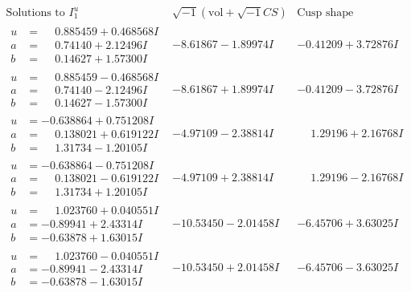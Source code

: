 \documentclass[1p]{elsarticle_modified}
\theoremstyle{definition}
\newcommand{\I}{\sqrt{-1}}
\begin{document}
$$\begin{array}{c|c|c}  
\text{Solutions to }I^u_{1}& \I (\text{vol} + \sqrt{-1}CS) & \text{Cusp shape}\\
 \hline 
\begin{aligned}
u &= \phantom{-}0.885459 + 0.468568 I \\
a &= \phantom{-}0.74140 + 2.12496 I \\
b &= \phantom{-}0.14627 + 1.57300 I\end{aligned}
 & -8.61867 - 1.89974 I & -0.41209 + 3.72876 I \\ \hline\begin{aligned}
u &= \phantom{-}0.885459 - 0.468568 I \\
a &= \phantom{-}0.74140 - 2.12496 I \\
b &= \phantom{-}0.14627 - 1.57300 I\end{aligned}
 & -8.61867 + 1.89974 I & -0.41209 - 3.72876 I \\ \hline\begin{aligned}
u &= -0.638864 + 0.751208 I \\
a &= \phantom{-}0.138021 + 0.619122 I \\
b &= \phantom{-}1.31734 - 1.20105 I\end{aligned}
 & -4.97109 - 2.38814 I & \phantom{-}1.29196 + 2.16768 I \\ \hline\begin{aligned}
u &= -0.638864 - 0.751208 I \\
a &= \phantom{-}0.138021 - 0.619122 I \\
b &= \phantom{-}1.31734 + 1.20105 I\end{aligned}
 & -4.97109 + 2.38814 I & \phantom{-}1.29196 - 2.16768 I \\ \hline\begin{aligned}
u &= \phantom{-}1.023760 + 0.040551 I \\
a &= -0.89941 + 2.43314 I \\
b &= -0.63878 + 1.63015 I\end{aligned}
 & -10.53450 - 2.01458 I & -6.45706 + 3.63025 I \\ \hline\begin{aligned}
u &= \phantom{-}1.023760 - 0.040551 I \\
a &= -0.89941 - 2.43314 I \\
b &= -0.63878 - 1.63015 I\end{aligned}
 & -10.53450 + 2.01458 I & -6.45706 - 3.63025 I \\ \hline\begin{aligned}

\end{aligned}
\end{array}$$
\end{document}
